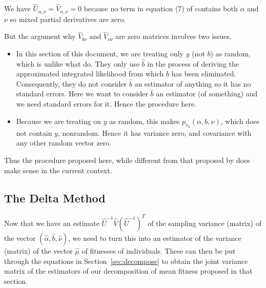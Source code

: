 \documentclass[11pt]{article}
\begin{document}
We have $\widehat{U}_{\alpha, \nu} = \widehat{V}_{\alpha, \nu} = 0$
because no term in equation (7) of \citet{reaster} contains both $\alpha$
and $\nu$ so mixed partial derivatives are zero.

But the argument why $\widehat{V}_{b \nu}$ and $\widehat{V}_{\nu \nu}$
are zero matrices involves two issues.
\begin{itemize}
\item In this section of this document, we are treating only $y$ (not $b$)
    as random, which is unlike what \citet{reaster} do.  They only use
    $\hat{b}$ in the process of deriving the approximated integrated
    likelihood from which $b$ has been eliminated.  Consequently, they
    do not consider $\hat{b}$ an estimator of anything so it has no
    standard errors.  Here we want to consider $\hat{b}$ an estimator
    (of something) and we need standard errors for it.  Hence the
    procedure here.
\item Because we are treating on $y$ as random, this makes
   $p_{\nu_k}(\alpha, b, \nu)$, which does not contain $y$, nonrandom.
   Hence it has variance zero, and covariance with any other random vector
   zero.
\end{itemize}

Thus the procedure proposed here, while different from that proposed
by \citet{reaster} does make sense in the current context.

\subsection{The Delta Method}

Now that we have
an estimate $\widehat{U}^{-1} \widehat{V} (\widehat{U}^{-1})^T$
of the sampling variance (matrix) of
the vector $(\hat{\alpha}, \hat{b}, \hat{\nu})$, we need to turn this
into an estimator of the variance (matrix) of the vector $\hat{\mu}$ of
fitnesses of individuals.  These can then be put through the equations
in Section~\ref{sec:decompose} to obtain the joint variance matrix of
the estimators of our decomposition of mean fitness proposed in that section.
\end{document}
